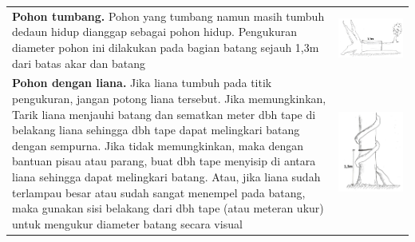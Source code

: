 \documentclass[
  oneside]{book}
\begin{document}
\begin{longtable}[]{@{}
  >{\raggedright\arraybackslash}p{}
  >{\raggedright\arraybackslash}p{}@{}}
\textbf{Pohon tumbang.} Pohon yang tumbang namun masih tumbuh dedaun hidup dianggap sebagai pohon hidup. Pengukuran diameter pohon ini dilakukan pada bagian batang sejauh 1,3m dari batas akar dan batang & \includegraphics{images/vtb8.jpg} \\
\textbf{Pohon dengan liana.} Jika liana tumbuh pada titik pengukuran, jangan potong liana tersebut. Jika memungkinkan, Tarik liana menjauhi batang dan sematkan meter dbh tape di belakang liana sehingga dbh tape dapat melingkari batang dengan sempurna. Jika tidak memungkinkan, maka dengan bantuan pisau atau parang, buat dbh tape menyisip di antara liana sehingga dapat melingkari batang. Atau, jika liana sudah terlampau besar atau sudah sangat menempel pada batang, maka gunakan sisi belakang dari dbh tape (atau meteran ukur) untuk mengukur diameter batang secara visual & \includegraphics{images/vtb9.jpg} \\

\end{longtable}
\end{document}
